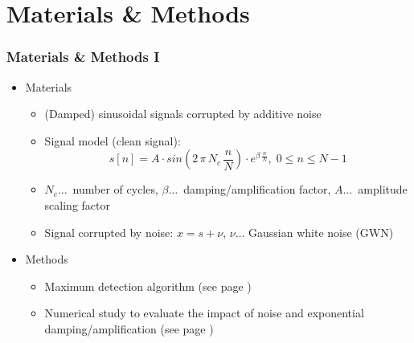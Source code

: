 \documentclass[11pt,aspectratio=169]{beamer}
\begin{document}
	\section{Materials \& Methods}
	\begin{frame}
		\frametitle{Materials \& Methods I}
		\begin{itemize}
			\setlength\itemsep{0.5em}
			\item \textcolor{RIPtitlecol}{Materials}
			\begin{itemize}
				\setlength\itemsep{0.5em}
				\item (Damped) sinusoidal signals corrupted by additive noise
				\item Signal model (clean signal):
				\begin{equation}
					s[n] = A \cdot sin\left(2 \, \pi \, N_c \, \frac{n}{N}\right) \cdot e^{\beta \, \frac{n}{N}}, \; 0 \leq n \leq N-1 \label{eq:sigmodel}
				\end{equation}
				\item $N_c \ldots$~number of cycles, $\beta \ldots$~damping/amplification factor, $A \ldots$~amplitude scaling factor
				\item Signal corrupted by noise: $x = s + \nu$, $\nu \ldots$ Gaussian white noise (GWN)
			\end{itemize}
			\item \textcolor{RIPtitlecol}{Methods}
			\begin{itemize}
				\setlength\itemsep{0.5em}
				\item Maximum detection algorithm (see page \pageref{algo:detection})
				\item Numerical study to evaluate the impact of noise and exponential damping/amplification (see page \pageref{param:study})
			\end{itemize}
		\end{itemize}
	\end{frame}
\end{document}
